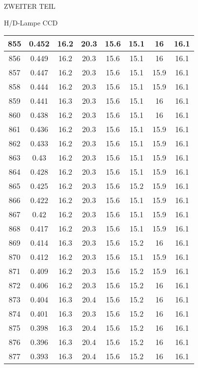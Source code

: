 \begin{appendix}
\begin{chapter}{ZWEITER TEIL}
\begin{section}{H/D-Lampe CCD}
\begin{scriptsize}
\begin{longtable}[htbp]{|c|c|c|c|c|c|c|c|}
            855 & 0.452 & 16.2 & 20.3 & 15.6 & 15.1 & 16 & 16.1 \\ \hline
            856 & 0.449 & 16.2 & 20.3 & 15.6 & 15.1 & 16 & 16.1 \\ \hline
            857 & 0.447 & 16.2 & 20.3 & 15.6 & 15.1 & 15.9 & 16.1 \\ \hline
            858 & 0.444 & 16.2 & 20.3 & 15.6 & 15.1 & 15.9 & 16.1 \\ \hline
            859 & 0.441 & 16.3 & 20.3 & 15.6 & 15.1 & 16 & 16.1 \\ \hline
            860 & 0.438 & 16.2 & 20.3 & 15.6 & 15.1 & 16 & 16.1 \\ \hline
            861 & 0.436 & 16.2 & 20.3 & 15.6 & 15.1 & 15.9 & 16.1 \\ \hline
            862 & 0.433 & 16.2 & 20.3 & 15.6 & 15.1 & 15.9 & 16.1 \\ \hline
            863 & 0.43 & 16.2 & 20.3 & 15.6 & 15.1 & 15.9 & 16.1 \\ \hline
            864 & 0.428 & 16.2 & 20.3 & 15.6 & 15.1 & 15.9 & 16.1 \\ \hline
            865 & 0.425 & 16.2 & 20.3 & 15.6 & 15.2 & 15.9 & 16.1 \\ \hline
            866 & 0.422 & 16.2 & 20.3 & 15.6 & 15.1 & 15.9 & 16.1 \\ \hline
            867 & 0.42 & 16.2 & 20.3 & 15.6 & 15.1 & 15.9 & 16.1 \\ \hline
            868 & 0.417 & 16.2 & 20.3 & 15.6 & 15.1 & 15.9 & 16.1 \\ \hline
            869 & 0.414 & 16.3 & 20.3 & 15.6 & 15.2 & 16 & 16.1 \\ \hline
            870 & 0.412 & 16.2 & 20.3 & 15.6 & 15.1 & 15.9 & 16.1 \\ \hline
            871 & 0.409 & 16.2 & 20.3 & 15.6 & 15.2 & 15.9 & 16.1 \\ \hline
            872 & 0.406 & 16.2 & 20.3 & 15.6 & 15.2 & 16 & 16.1 \\ \hline
            873 & 0.404 & 16.3 & 20.4 & 15.6 & 15.2 & 16 & 16.1 \\ \hline
            874 & 0.401 & 16.3 & 20.3 & 15.6 & 15.2 & 16 & 16.1 \\ \hline
            875 & 0.398 & 16.3 & 20.4 & 15.6 & 15.2 & 16 & 16.1 \\ \hline
            876 & 0.396 & 16.3 & 20.4 & 15.6 & 15.2 & 16 & 16.1 \\ \hline
            877 & 0.393 & 16.3 & 20.4 & 15.6 & 15.2 & 16 & 16.1 \\ \hline

\end{longtable}
\end{scriptsize}
\end{section}
\end{chapter}
\end{appendix}
